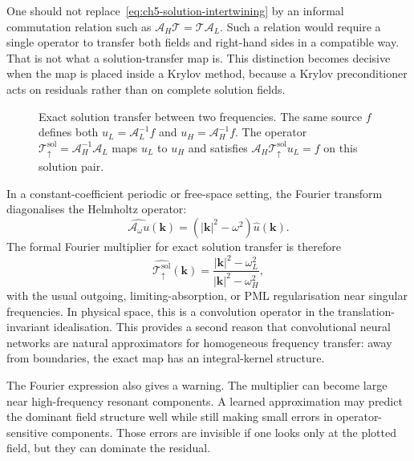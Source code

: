 One should not replace~\eqref{eq:ch5-solution-intertwining} by an informal
commutation relation such as
$\mathcal{A}_H\mathcal{T}=\mathcal{T}\mathcal{A}_L$. Such a relation would
require a single operator to transfer both fields and right-hand sides in a
compatible way. That is not what a solution-transfer map is. This distinction
becomes decisive when the map is placed inside a Krylov method, because a
Krylov preconditioner acts on residuals rather than on complete solution
fields.

\begin{figure}[htbp]
    \centering
    \caption{Exact solution transfer between two frequencies. The same source
    $f$ defines both $u_L=\mathcal{A}_L^{-1}f$ and
    $u_H=\mathcal{A}_H^{-1}f$. The operator
    $\mathcal{T}_{\uparrow}^{\mathrm{sol}}=\mathcal{A}_H^{-1}\mathcal{A}_L$
    maps $u_L$ to $u_H$ and satisfies
    $\mathcal{A}_H\mathcal{T}_{\uparrow}^{\mathrm{sol}}u_L=f$ on this
    solution pair.}
    \label{fig:ch5-solution-transfer-schematic}
\end{figure}

In a constant-coefficient periodic or free-space setting, the Fourier
transform diagonalises the Helmholtz operator:
\begin{equation}
    \widehat{\mathcal{A}_\omega u}(\mathbf{k})
    =
    \left(|\mathbf{k}|^2-\omega^2\right)\hat{u}(\mathbf{k}).
    \label{eq:ch5-fourier-symbol-A}
\end{equation}
The formal Fourier multiplier for exact solution transfer is therefore
\begin{equation}
    \widehat{\mathcal{T}_{\uparrow}^{\mathrm{sol}}}(\mathbf{k})
    =
    \frac{|\mathbf{k}|^2-\omega_L^2}
         {|\mathbf{k}|^2-\omega_H^2},
    \label{eq:ch5-fourier-symbol-transfer}
\end{equation}
with the usual outgoing, limiting-absorption, or PML regularisation near
singular frequencies. In physical space, this is a convolution operator in the
translation-invariant idealisation. This provides a second reason that
convolutional neural networks are natural approximators for homogeneous
frequency transfer: away from boundaries, the exact map has an integral-kernel
structure.

The Fourier expression also gives a warning. The multiplier can become large
near high-frequency resonant components. A learned approximation may predict
the dominant field structure well while still making small errors in
operator-sensitive components. Those errors are invisible if one looks only at
the plotted field, but they can dominate the residual.

